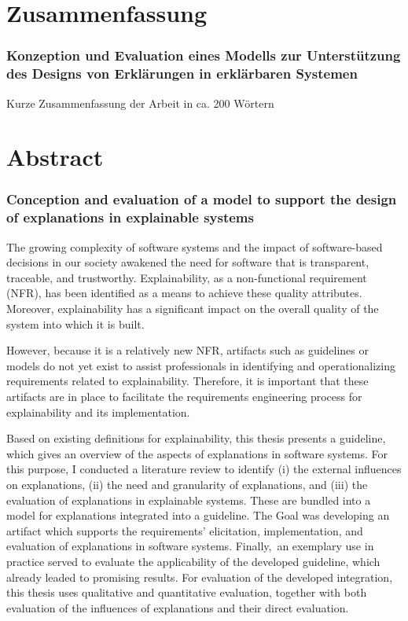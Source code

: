 \chapter*{Zusammenfassung}

\subsection*{Konzeption und Evaluation eines Modells zur Unterstützung des Designs von Erklärungen in erklärbaren Systemen}

Kurze Zusammenfassung der Arbeit in ca. 200 Wörtern

\clearpage

\chapter*{Abstract}

\subsection*{Conception and evaluation of a model to support the design of explanations in explainable systems}

The growing complexity of software systems and the impact of software-based decisions in our society awakened the need for software that is transparent, traceable, and trustworthy. Explainability, as a non-functional requirement (NFR), has been identified as a means to achieve these quality attributes. Moreover, explainability has a significant impact on the overall quality of the system into which it is built.

However, because it is a relatively new NFR, artifacts such as guidelines or models do not yet exist to assist professionals in identifying and operationalizing requirements related to explainability. Therefore, it is important that these artifacts are in place to facilitate the requirements engineering process for explainability and its implementation.

Based on existing definitions for explainability,  this thesis presents a guideline, which gives an overview of the aspects of explanations in software systems. For this purpose, I conducted a literature review to identify (i) the external influences on explanations, (ii) the need and granularity of explanations, and (iii) the evaluation of explanations in explainable systems. These are bundled into a model for explanations integrated into a guideline. The Goal was developing an artifact which supports the requirements' elicitation, implementation, and evaluation  of explanations in software systems. Finally, an exemplary use in practice served to evaluate the applicability of the developed guideline, which already leaded to promising results. For evaluation of the developed integration, this thesis uses qualitative and quantitative evaluation, together with both evaluation of the influences of explanations and their direct evaluation.

